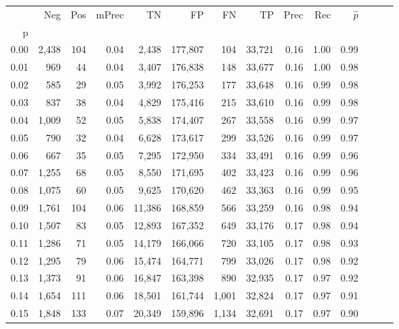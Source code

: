 \begin{tabular}{rrrrrrrrrrrrrr}
\toprule
{} &    Neg &  Pos & mPrec &       TN &       FP &      FN &      TP &  Prec &   Rec & $\hat{p}$ \\
p    &        &      &       &          &          &         &         &       &       &           \\
\midrule
0.00 &  2,438 &  104 &  0.04 &    2,438 &  177,807 &     104 &  33,721 &  0.16 &  1.00 &      0.99 \\
0.01 &    969 &   44 &  0.04 &    3,407 &  176,838 &     148 &  33,677 &  0.16 &  1.00 &      0.98 \\
0.02 &    585 &   29 &  0.05 &    3,992 &  176,253 &     177 &  33,648 &  0.16 &  0.99 &      0.98 \\
0.03 &    837 &   38 &  0.04 &    4,829 &  175,416 &     215 &  33,610 &  0.16 &  0.99 &      0.98 \\
0.04 &  1,009 &   52 &  0.05 &    5,838 &  174,407 &     267 &  33,558 &  0.16 &  0.99 &      0.97 \\
0.05 &    790 &   32 &  0.04 &    6,628 &  173,617 &     299 &  33,526 &  0.16 &  0.99 &      0.97 \\
0.06 &    667 &   35 &  0.05 &    7,295 &  172,950 &     334 &  33,491 &  0.16 &  0.99 &      0.96 \\
0.07 &  1,255 &   68 &  0.05 &    8,550 &  171,695 &     402 &  33,423 &  0.16 &  0.99 &      0.96 \\
0.08 &  1,075 &   60 &  0.05 &    9,625 &  170,620 &     462 &  33,363 &  0.16 &  0.99 &      0.95 \\
0.09 &  1,761 &  104 &  0.06 &   11,386 &  168,859 &     566 &  33,259 &  0.16 &  0.98 &      0.94 \\
0.10 &  1,507 &   83 &  0.05 &   12,893 &  167,352 &     649 &  33,176 &  0.17 &  0.98 &      0.94 \\
0.11 &  1,286 &   71 &  0.05 &   14,179 &  166,066 &     720 &  33,105 &  0.17 &  0.98 &      0.93 \\
0.12 &  1,295 &   79 &  0.06 &   15,474 &  164,771 &     799 &  33,026 &  0.17 &  0.98 &      0.92 \\
0.13 &  1,373 &   91 &  0.06 &   16,847 &  163,398 &     890 &  32,935 &  0.17 &  0.97 &      0.92 \\
0.14 &  1,654 &  111 &  0.06 &   18,501 &  161,744 &   1,001 &  32,824 &  0.17 &  0.97 &      0.91 \\
0.15 &  1,848 &  133 &  0.07 &   20,349 &  159,896 &   1,134 &  32,691 &  0.17 &  0.97 &      0.90 \\

\end{tabular}

